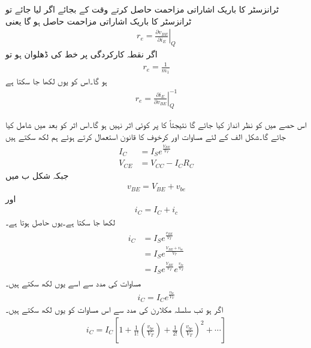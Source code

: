 ٹرانزسٹر  کا باریک اشاراتی مزاحمت حاصل کرتے وقت  کے بجائے اگر  لیا جائے تو ٹرانزسٹر کا باریک اشاراتی مزاحمت  حاصل ہو گا یعنی
\begin{align}
r_e = \left . \frac{\partial v_{BE}}{\partial i_E}\right |_Q
\end{align}
اگر نقطہ کارکردگی پر  خط کی ڈھلوان  ہو تو 
\begin{align}
r_e =\frac{1}{m_1}
\end{align}
ہو گا۔اس کو یوں لکھا جا سکتا ہے
\begin{align}
r_e =\left. \frac{\partial i_E}{\partial v_{BE}} \right |_Q^{-1}
\end{align}

اس حصے میں    کو نظر انداز کیا جائے گا نتیجتاً   کا  پر کوئی اثر نہیں ہو گا۔اس اثر کو بعد میں شامل کیا جائے گا۔شکل   الف کے لئے مساوات  اور کرخوف کا قانون استعمال کرتے ہوئے ہم لکھ سکتے ہیں
\begin{align}
I_C&=I_S e^{\frac{V_{BE}}{V_T}} \label{مساوات_ٹرانزسٹر_یک_سمتی_رو_الف}\\
V_{CE}&=V_{CC}-I_C R_C \label{مساوات_ٹرانزسٹر_یک_سمتی_دباو_الف}
\end{align}
جبکہ شکل  ب میں
\begin{align} \label{مساوات_ٹرانزسٹر_داخلی_دباو_کے_یکسمتی_اور_بدلتا_حصے}
v_{BE}=V_{BE}+v_{be}
\end{align}
اور
\begin{align} \label{مساوات_ٹرانزسٹر_رو_کے_یکسمتی_اور_بدلتا_حصے}
i_C=I_C+i_c
\end{align}
لکھا جا سکتا ہے۔یوں حاصل ہوتا ہے۔
\begin{gather}
\begin{aligned}
i_C&=I_S e^{\frac{v_{BE}}{V_T}}\\
&=I_S e^{\frac{V_{BE}+v_{be}}{V_T}}\\
&=I_S e^{\frac{V_{BE}}{V_T}} e^{\frac{v_{be}}{V_T}}
\end{aligned}
\end{gather}
مساوات   کی مدد سے اسے یوں لکھ سکتے ہیں۔
\begin{align}
i_C = I_C e^{\frac{v_{be}}{V_T}}
\end{align}
اگر   ہو تب سلسلہ مکلارن  کی مدد سے اس مساوات کو یوں لکھ سکتے ہیں۔
\begin{align} \label{مساوات_ٹرانزسٹر_سلسلہ+مکلارن}
i_C=I_C \left [1+\frac{1}{1!} \left(\frac{v_{be}}{V_T} \right )+\frac{1}{2!} \left(\frac{v_{be}}{V_T} \right)^2+ \cdots \right ]
\end{align}
